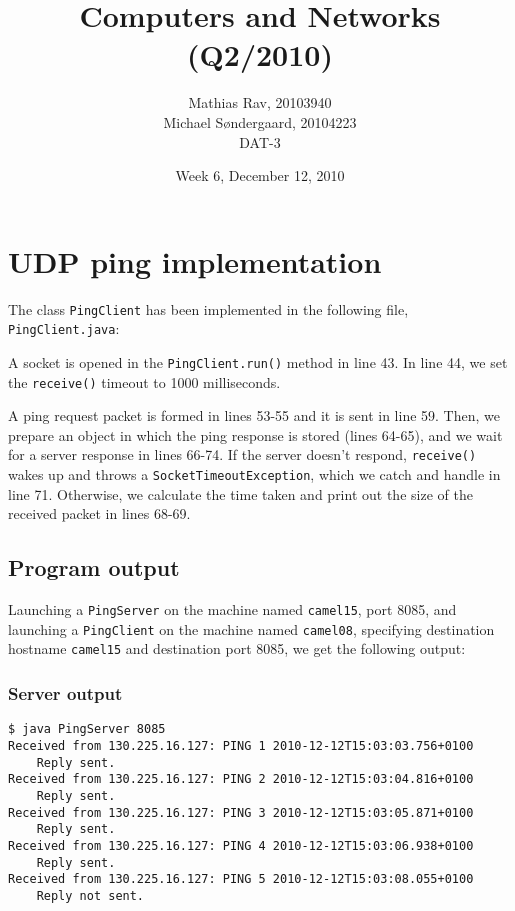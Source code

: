 \documentclass[12pt,a4paper]{article}
\title{Computers and Networks (Q2/2010)}
\author{Mathias Rav, 20103940 \\
        Michael Søndergaard, 20104223 \\
        DAT-3}
\date{Week 6, December 12, 2010}
\begin{document}
\maketitle

\section{UDP ping implementation}
The class \texttt{PingClient} has been implemented in the following file, \texttt{PingClient.java}:



A socket is opened in the \texttt{PingClient.run()} method in line 43. In line
44, we set the \texttt{receive()} timeout to 1000 milliseconds.

A ping request packet is formed in lines 53-55 and it is sent in line 59. Then,
we prepare an object in which the ping response is stored (lines 64-65), and we
wait for a server response in lines 66-74. If the server doesn't respond,
\texttt{receive()} wakes up and throws a \texttt{SocketTimeoutException}, which
we catch and handle in line 71. Otherwise, we calculate the time taken and
print out the size of the received packet in lines 68-69.

\subsection{Program output}

Launching a \texttt{PingServer} on the machine named \texttt{camel15}, port
8085, and launching a \texttt{PingClient} on the machine named
\texttt{camel08}, specifying destination hostname \texttt{camel15} and
destination port 8085, we get the following output:

\subsubsection{Server output}
\begin{lstlisting}[]
$ java PingServer 8085
Received from 130.225.16.127: PING 1 2010-12-12T15:03:03.756+0100
	Reply sent.
Received from 130.225.16.127: PING 2 2010-12-12T15:03:04.816+0100
	Reply sent.
Received from 130.225.16.127: PING 3 2010-12-12T15:03:05.871+0100
	Reply sent.
Received from 130.225.16.127: PING 4 2010-12-12T15:03:06.938+0100
	Reply sent.
Received from 130.225.16.127: PING 5 2010-12-12T15:03:08.055+0100
	Reply not sent.
\end{lstlisting}
\end{document}
